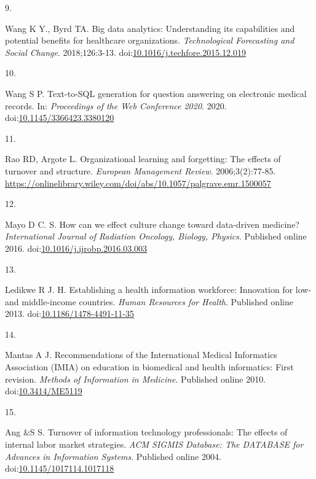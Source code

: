 \documentclass[
  american,
  11pt,
  letterpaper,
  oneside  ,captions=tableheading
]{scrartcl}
\newlength{\cslhangindent}
\newlength{\csllabelwidth}
\newenvironment{CSLReferences}[2] %
 {\begin{list}{}{%
  \setlength{\itemindent}{0pt}
  \setlength{\leftmargin}{0pt}
  \setlength{\parsep}{0pt}
  \ifodd #1
   \setlength{\leftmargin}{\cslhangindent}
   \setlength{\itemindent}{-1\cslhangindent}
  \fi
  \setlength{\itemsep}{#2\baselineskip}}}
 {\end{list}}
\newcommand{\CSLLeftMargin}[1]{\parbox[t]{\csllabelwidth}{\strut#1\strut}}
\newcommand{\CSLRightInline}[1]{\parbox[t]{\linewidth - \csllabelwidth}{\strut#1\strut}}
\begin{document}
\begin{CSLReferences}{0}{1}
\CSLLeftMargin{9. }%
\CSLRightInline{Wang K Y., Byrd TA. {Big data analytics: Understanding
its capabilities and potential benefits for healthcare organizations}.
\emph{Technological Forecasting and Social Change}. 2018;126:3-13.
doi:\href{https://doi.org/10.1016/j.techfore.2015.12.019}{10.1016/j.techfore.2015.12.019}}

\CSLLeftMargin{10. }%
\CSLRightInline{Wang S P. {Text-to-SQL generation for question answering
on electronic medical records}. In: \emph{Proceedings of the Web
Conference 2020}. 2020.
doi:\href{https://doi.org/10.1145/3366423.3380120}{10.1145/3366423.3380120}}

\CSLLeftMargin{11. }%
\CSLRightInline{Rao RD, Argote L. Organizational learning and
forgetting: The effects of turnover and structure. \emph{European
Management Review}. 2006;3(2):77-85.
\url{https://onlinelibrary.wiley.com/doi/abs/10.1057/palgrave.emr.1500057}}

\CSLLeftMargin{12. }%
\CSLRightInline{Mayo D C. S. {How can we effect culture change toward
data-driven medicine?} \emph{International Journal of Radiation
Oncology, Biology, Physics}. Published online 2016.
doi:\href{https://doi.org/10.1016/j.ijrobp.2016.03.003}{10.1016/j.ijrobp.2016.03.003}}

\CSLLeftMargin{13. }%
\CSLRightInline{Ledikwe R J. H. {Establishing a health information
workforce: Innovation for low- and middle-income countries}. \emph{Human
Resources for Health}. Published online 2013.
doi:\href{https://doi.org/10.1186/1478-4491-11-35}{10.1186/1478-4491-11-35}}

\CSLLeftMargin{14. }%
\CSLRightInline{Mantas A J. {Recommendations of the International
Medical Informatics Association (IMIA) on education in biomedical and
health informatics: First revision}. \emph{Methods of Information in
Medicine}. Published online 2010.
doi:\href{https://doi.org/10.3414/ME5119}{10.3414/ME5119}}

\CSLLeftMargin{15. }%
\CSLRightInline{Ang \&S S. {Turnover of information technology
professionals: The effects of internal labor market strategies}.
\emph{{ACM} {SIGMIS} Database: The {DATABASE} for Advances in
Information Systems}. Published online 2004.
doi:\href{https://doi.org/10.1145/1017114.1017118}{10.1145/1017114.1017118}}


\end{CSLReferences}
\end{document}
